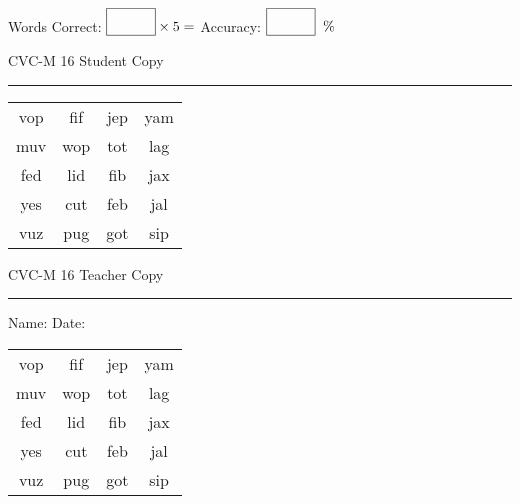 \documentclass{memoir}
\begin{document}
\small

Words Correct: $\fbox{\phantom{\huge 100}} \times 5 = $ Accuracy: $\fbox{\phantom{\huge 100}}\;\; \%$ 

\vfill

\newpage


\footnotesize \noindent
CVC-M 16 \hfill Student Copy
\smallskip
\hrule

\Large

\setlength{\tabcolsep}{14pt}
\def\arraystretch{2}

{\selectfont


\begin{vplace}[0.5]
\begin{center}
\begin{tabular}{cccc}
vop & fif & jep & yam \\
muv & wop & tot & lag \\
fed & lid & fib & jax \\
yes & cut & feb & jal \\
vuz & pug & got & sip \\
\end{tabular}
\end{center}
\end{vplace}

}

\newpage

\footnotesize \noindent
CVC-M 16 \hfill Teacher Copy
\smallskip
\hrule

\small

\vfill

\noindent
Name: \underline{\hspace{1.75in}} \hfill Date: \underline{\hspace{1in}}

\Large

{\selectfont


\begin{vplace}[0.5]
\begin{center}
\begin{tabular}{cccc}
vop & fif & jep & yam \\
muv & wop & tot & lag \\
fed & lid & fib & jax \\
yes & cut & feb & jal \\
vuz & pug & got & sip \\
\end{tabular}
\end{center}
\end{vplace}



}
\end{document}
